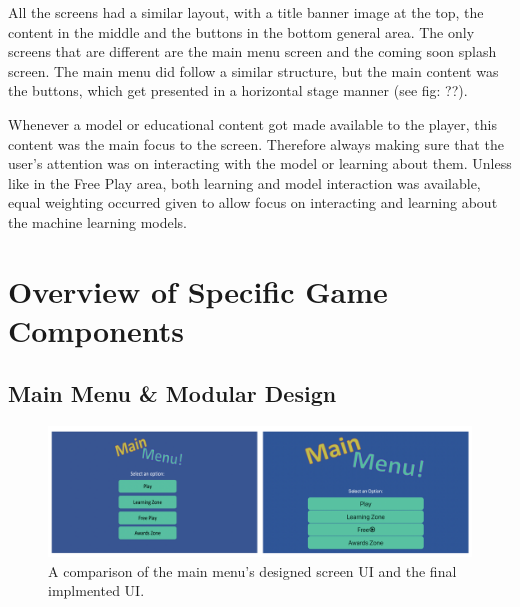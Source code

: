 	All the screens had a similar layout, with a title banner image at the top, the content in the middle and the buttons in the bottom general area. The only screens that are different are the main menu screen and the coming soon splash screen. The main menu did follow a similar structure, but the main content was the buttons, which get presented in a horizontal stage manner (see fig: ??).
	
	Whenever a model or educational content got made available to the player, this content was the main focus to the screen. Therefore always making sure that the user's attention was on interacting with the model or learning about them. Unless like in the Free Play area, both learning and model interaction was available, equal weighting occurred given to allow focus on interacting and learning about the machine learning models.
		
	
	
	
	
		
		
		
	\section{Overview of Specific Game Components}
		\label{sec:overview_game_components}
		
	
	\subsection{Main Menu \& Modular Design}
	\begin{figure}[t]
		\includegraphics[width=15cm]{graphics/main_menu.png}
		\caption{A comparison of the main menu's designed screen UI and the final implmented UI.}
		\label{fig:ui_mm}
	\end{figure}

